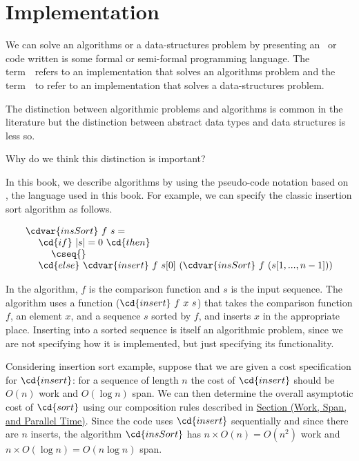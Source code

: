 \section{Implementation}

\begin{gram}
We can solve an algorithms or a data-structures problem by presenting an~ or code written is some formal or semi-formal programming language.  
%
The term~~refers to an implementation that solves an algorithms problem and the term~~to refer to an implementation that solves a data-structures problem.
\end{gram}


\begin{note}
The distinction between algorithmic problems and algorithms is common
in the literature but the distinction between abstract data types and
data structures is less so.
\end{note}


\begin{teachnote}
Why do we think this distinction is important?
\end{teachnote}

\begin{example}
In this book, we describe algorithms by using the pseudo-code notation based on \pml{}, the language used in this book.
%
%
For example, we can specify the classic insertion sort algorithm as
follows.
%

\[
\begin{array}{l}
\cdvar{insSort}~f~s =
\\ 
~~~~\cd{if}~|s| = 0~\cd{then} 
\\
~~~~~~~~\cseq{}
\\
~~~~\cd{else}~\cdvar{insert}~f~s[0]~(\cdvar{insSort}~f~(s[1,...,n-1]))
\end{array}
\]


In the algorithm, $f$ is the comparison function and $s$ is the input
sequence.  The algorithm uses a function ($\cd{insert}~f~x~s$) that takes the comparison function $f$, an element $x$, and a sequence $s$ sorted by $f$, and inserts $x$ in the appropriate place.  
%
Inserting into a sorted sequence is itself an algorithmic problem, since we are not specifying how it is implemented, but just specifying its functionality.  
%
\end{example}

\begin{example}
Considering insertion sort example, suppose that we are given a cost specification for $\cd{insert}$: for a sequence of length $n$ the cost of $\cd{insert}$ should be $O(n)$ work and $O(\log n)$ span.
%
We can then determine the overall asymptotic cost of $\cd{sort}$ using our composition rules described in 
%
\href{sec:introduction::parallelism::work-span}
{Section (Work, Span, and Parallel Time)}.
%
Since the code uses $\cd{insert}$ sequentially and since there are $n$ inserts, the algorithm $\cd{insSort}$ has $n \times O(n) = O(n^2)$ work and $n \times O(\log n) = O(n \log n)$ span.
\end{example}

